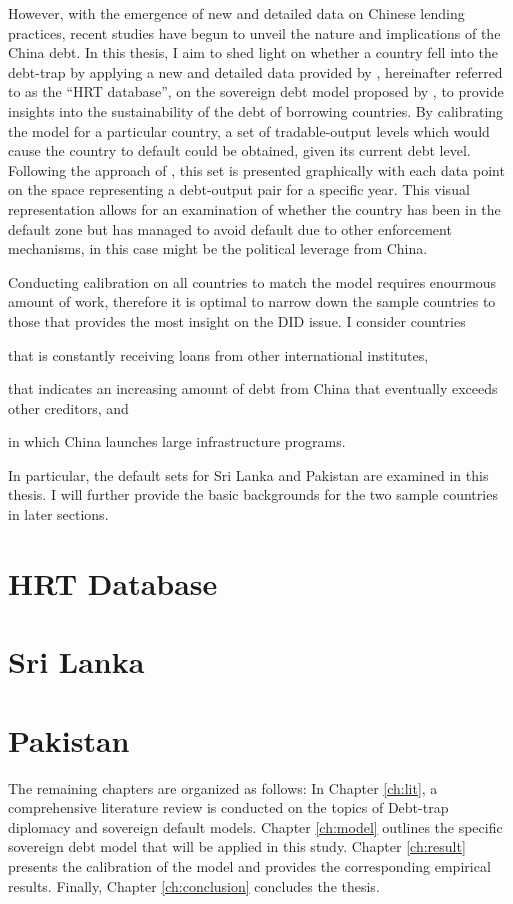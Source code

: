 However, with the emergence of new and detailed data on Chinese lending practices, recent studies have begun to unveil the nature and implications of the China debt.
In this thesis, I aim to shed light on whether a country fell into the debt-trap by applying a new and detailed data provided by \citet*{Horn-Reinhart-Trebesch-21}, hereinafter referred to as the ``HRT database'', on the sovereign debt model proposed by \citet*{Na-18}, to provide insights into the sustainability of the debt of borrowing countries.
By calibrating the model for a particular country, a set of tradable-output levels which would cause the country to default could be obtained, given its current debt level. Following the approach of \citet{Hinrichsen_2020-chapter4}, this set is presented graphically with each data point on the space representing a debt-output pair for a specific year. This visual representation allows for an examination of whether the country has been in the default zone but has managed to avoid default due to other enforcement mechanisms, in this case might be the political leverage from China.

Conducting calibration on all countries to match the model requires enourmous amount of work, therefore it is optimal to narrow down the sample countries to those that provides the most insight on the DID issue. I consider countries
\begin{enumerate*}
    \item that is constantly receiving loans from other international institutes,
    \item that indicates an increasing amount of debt from China that eventually exceeds other creditors, and
    \item in which China launches large infrastructure programs.
\end{enumerate*}
In particular, the default sets for Sri Lanka and Pakistan are examined in this thesis. I will further provide the basic backgrounds for the two sample countries in later sections.

\section*{HRT Database}


\section*{Sri Lanka}

\section*{Pakistan}


The remaining chapters are organized as follows:
In Chapter \ref{ch:lit}, a comprehensive literature review is conducted on the topics of Debt-trap diplomacy and sovereign default models.
Chapter \ref{ch:model} outlines the specific sovereign debt model that will be applied in this study.
Chapter \ref{ch:result} presents the calibration of the model and provides the corresponding empirical results.
Finally, Chapter \ref{ch:conclusion} concludes the thesis.